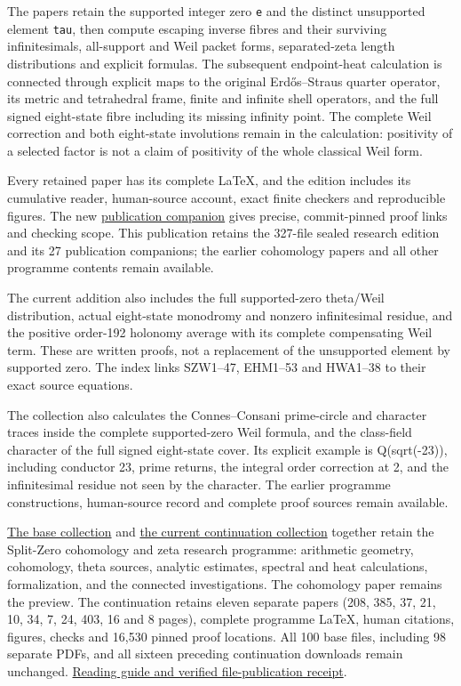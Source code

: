 \documentclass[
]{article}
\begin{document}
The papers retain the supported integer zero \texttt{e} and the distinct
unsupported element \texttt{tau}, then compute escaping inverse fibres
and their surviving infinitesimals, all-support and Weil packet forms,
separated-zeta length distributions and explicit formulas. The
subsequent endpoint-heat calculation is connected through explicit maps
to the original Erdős--Straus quarter operator, its metric and
tetrahedral frame, finite and infinite shell operators, and the full
signed eight-state fibre including its missing infinity point. The
complete Weil correction and both eight-state involutions remain in the
calculation: positivity of a selected factor is not a claim of
positivity of the whole classical Weil form.

Every retained paper has its complete LaTeX, and the edition includes
its cumulative reader, human-source account, exact finite checkers and
reproducible figures. The new
\href{https://github.com/KokunoYumeto/zeta-function-research-reader/blob/main/workbenches/splitzero-tandem/branches/tau-zero-prime-positivity/PUBLICATION_COMPANION.md}{publication
companion} gives precise, commit-pinned proof links and checking scope.
This publication retains the 327-file sealed research edition and its 27
publication companions; the earlier cohomology papers and all other
programme contents remain available.

The current addition also includes the full supported-zero theta/Weil
distribution, actual eight-state monodromy and nonzero infinitesimal
residue, and the positive order-192 holonomy average with its complete
compensating Weil term. These are written proofs, not a replacement of
the unsupported element by supported zero. The index links SZW1--47,
EHM1--53 and HWA1--38 to their exact source equations.

The collection also calculates the Connes--Consani prime-circle and
character traces inside the complete supported-zero Weil formula, and
the class-field character of the full signed eight-state cover. Its
explicit example is Q(sqrt(-23)), including conductor 23, prime returns,
the integral order correction at 2, and the infinitesimal residue not
seen by the character. The earlier programme constructions, human-source
record and complete proof sources remain available.

\href{https://zenodo.org/records/22911829}{The base collection} and
\href{https://zenodo.org/records/22950644}{the current continuation
collection} together retain the Split-Zero cohomology and zeta research
programme: arithmetic geometry, cohomology, theta sources, analytic
estimates, spectral and heat calculations, formalization, and the
connected investigations. The cohomology paper remains the preview. The
continuation retains eleven separate papers (208, 385, 37, 21, 10, 34,
7, 24, 403, 16 and 8 pages), complete programme LaTeX, human citations,
figures, checks and 16,530 pinned proof locations. All 100 base files,
including 98 separate PDFs, and all sixteen preceding continuation
downloads remain unchanged.
\href{https://github.com/KokunoYumeto/zeta-function-research-reader/blob/main/workbenches/splitzero-tandem/continuations/20260923-retained-source-publication/README.md}{Reading
guide and verified file-publication receipt}.
\end{document}
